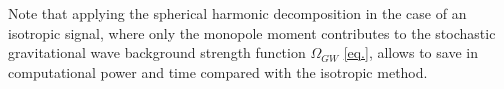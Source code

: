 Note that applying the spherical harmonic decomposition   in the case of an isotropic signal, where only the monopole moment contributes to the stochastic gravitational wave background strength function $\Omega_{GW}$ \ref{eq.},  allows to save in computational power and time compared with the isotropic method.




 








